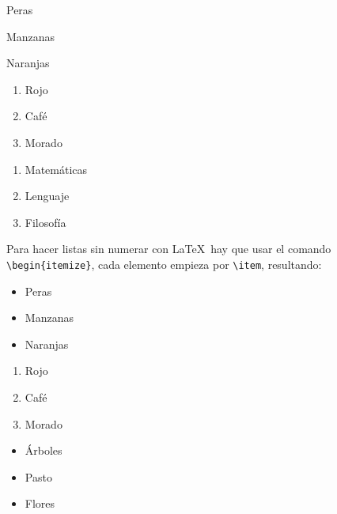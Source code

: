 	\begin{multicols}{3}
		\begin{enumeratebf}[label=\alph*) ] %
			\item Peras
			\item Manzanas
			\item Naranjas
		\end{enumeratebf}

		\begin{enumerate}[label=\roman*) ]
			\item Rojo
			\item Café
			\item Morado
		\end{enumerate}

		\begin{enumerate}[label=\greek*) ]
			\item Matemáticas
			\item Lenguaje
			\item Filosofía
		\end{enumerate}
	\end{multicols}

	Para hacer listas sin numerar con \LaTeX\ hay que usar el comando \texttt{\textbackslash begin\{itemize\}}, cada elemento empieza por \texttt{\textbackslash item}, resultando:

	\begin{multicols}{3}
		\begin{itemize}[label={--}]
			\item Peras
			\item Manzanas
			\item Naranjas
		\end{itemize}

		\begin{enumerate}[label={*}]
			\item Rojo
			\item Café
			\item Morado
		\end{enumerate}

		\begin{itemize}
			\item Árboles
			\item Pasto
			\item Flores
		\end{itemize}
	\end{multicols}



